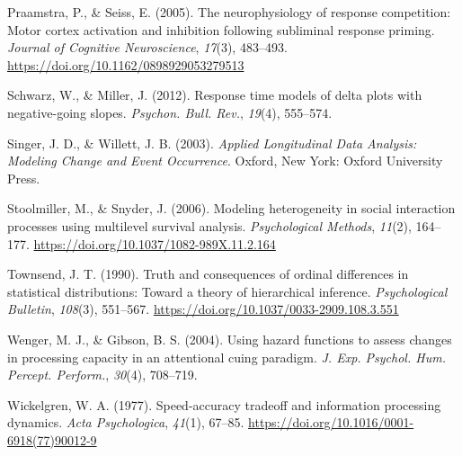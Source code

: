 \documentclass[
  english,
  man,floatsintext]{apa6}
\newlength{\cslhangindent}
\newenvironment{CSLReferences}[2] %
 {\begin{list}{}{%
  \setlength{\itemindent}{0pt}
  \setlength{\leftmargin}{0pt}
  \setlength{\parsep}{0pt}
  \ifodd #1
   \setlength{\leftmargin}{\cslhangindent}
   \setlength{\itemindent}{-1\cslhangindent}
  \fi
  \setlength{\itemsep}{#2\baselineskip}}}
 {\end{list}}
\begin{document}
\begin{CSLReferences}{1}{0}
Praamstra, P., \& Seiss, E. (2005). The neurophysiology of response competition: {Motor} cortex activation and inhibition following subliminal response priming. \emph{Journal of Cognitive Neuroscience}, \emph{17}(3), 483--493. \url{https://doi.org/10.1162/0898929053279513}

Schwarz, W., \& Miller, J. (2012). Response time models of delta plots with negative-going slopes. \emph{Psychon. Bull. Rev.}, \emph{19}(4), 555--574.

Singer, J. D., \& Willett, J. B. (2003). \emph{Applied {Longitudinal Data Analysis}: {Modeling Change} and {Event Occurrence}}. Oxford, New York: Oxford University Press.

Stoolmiller, M., \& Snyder, J. (2006). Modeling heterogeneity in social interaction processes using multilevel survival analysis. \emph{Psychological Methods}, \emph{11}(2), 164--177. \url{https://doi.org/10.1037/1082-989X.11.2.164}

Townsend, J. T. (1990). Truth and consequences of ordinal differences in statistical distributions: {Toward} a theory of hierarchical inference. \emph{Psychological Bulletin}, \emph{108}(3), 551--567. \url{https://doi.org/10.1037/0033-2909.108.3.551}

Wenger, M. J., \& Gibson, B. S. (2004). Using hazard functions to assess changes in processing capacity in an attentional cuing paradigm. \emph{J. Exp. Psychol. Hum. Percept. Perform.}, \emph{30}(4), 708--719.

Wickelgren, W. A. (1977). Speed-accuracy tradeoff and information processing dynamics. \emph{Acta Psychologica}, \emph{41}(1), 67--85. \url{https://doi.org/10.1016/0001-6918(77)90012-9}

\end{CSLReferences}
\end{document}
